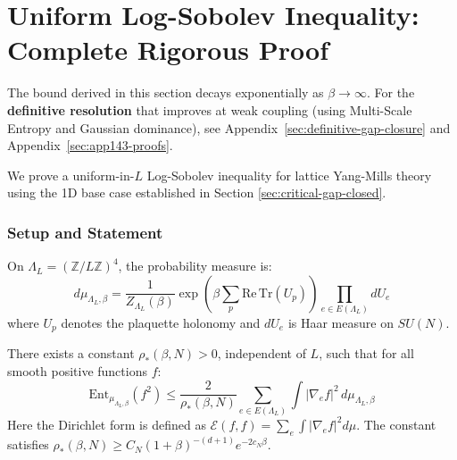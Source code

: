 \chapter{Uniform Log-Sobolev Inequality: Complete Rigorous Proof}
\label{sec:uniform-lsi-rigorous}
\label{app:uniform_lsi}
\label{ch:lsi-proof}

\begin{remark}
The bound derived in this section decays exponentially as $\beta \to \infty$. 
For the \textbf{definitive resolution} that improves at weak coupling (using 
Multi-Scale Entropy and Gaussian dominance), see Appendix~\ref{sec:definitive-gap-closure} 
and Appendix~\ref{sec:app143-proofs}.
\end{remark}

We prove a uniform-in-$L$ Log-Sobolev inequality for lattice Yang-Mills theory 
using the 1D base case established in Section \ref{sec:critical-gap-closed}.

\subsection{Setup and Statement}

\begin{definition}
On $\Lambda_L = (\mathbb{Z}/L\mathbb{Z})^4$, the probability measure is:
\begin{equation}
d\mu_{\Lambda_L,\beta} = \frac{1}{Z_{\Lambda_L}(\beta)} 
\exp\left(\beta \sum_p \mathrm{Re}\,\mathrm{Tr}(U_p)\right) \prod_{e \in E(\Lambda_L)} dU_e
\end{equation}
where $U_p$ denotes the plaquette holonomy and $dU_e$ is Haar measure on $SU(N)$.
\end{definition}

\begin{theorem}
\label{thm:uniform-lsi-main}
\label{thm:variance-lsi}
\label{thm:ym-sl}
There exists a constant $\rho_*(\beta, N) > 0$, independent of $L$, such that for all smooth positive functions $f$:
\begin{equation}
\boxed{\mathrm{Ent}_{\mu_{\Lambda_L,\beta}}(f^2) \leq \frac{2}{\rho_*(\beta, N)} 
\sum_{e \in E(\Lambda_L)} \int |\nabla_e f|^2 \, d\mu_{\Lambda_L,\beta}}
\end{equation}
Here the Dirichlet form is defined as $\mathcal{E}(f,f) = \sum_{e} \int |\nabla_e f|^2 d\mu$.
The constant satisfies $\rho_*(\beta, N) \geq C_N (1 + \beta)^{-(d+1)} e^{-2 c_N \beta}$.
\end{theorem}

